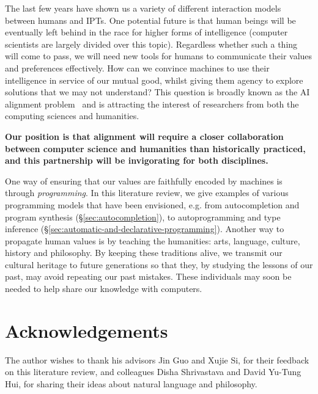 \documentclass[12pt]{article}
\begin{document}
The last few years have shown us a variety of different interaction models between humans and IPTs. One potential future is that human beings will be eventually left behind in the race for higher forms of intelligence (computer scientists are largely divided over this topic). Regardless whether such a thing will come to pass, we will need new tools for humans to communicate their values and preferences effectively. How can we convince machines to use their intelligence in service of our mutual good, whilst giving them agency to explore solutions that we may not understand? This question is broadly known as the AI alignment problem~\cite{kim2018mimetic, christian2020alignment, gabriel2020artificial} and is attracting the interest of researchers from both the computing sciences and humanities.

\textbf{Our position is that alignment will require a closer collaboration between computer science and humanities than historically practiced, and this partnership will be invigorating for both disciplines.}

One way of ensuring that our values are faithfully encoded by machines is through \textit{programming}. In this literature review, we give examples of various programming models that have been envisioned, e.g. from autocompletion and program synthesis (\S\ref{sec:autocompletion}), to autoprogramming and type inference (\S\ref{sec:automatic-and-declarative-programming}). Another way to propagate human values is by teaching the humanities: arts, language, culture, history and philosophy. By keeping these traditions alive, we transmit our cultural heritage to future generations so that they, by studying the lessons of our past, may avoid repeating our past mistakes. These individuals may soon be needed to help share our knowledge with computers.

\pagebreak \section{Acknowledgements}

The author wishes to thank his advisors Jin Guo and Xujie Si, for their feedback on this literature review, and colleagues Disha Shrivastava and David Yu-Tung Hui, for sharing their ideas about natural language and philosophy.

  
  
\end{document}

